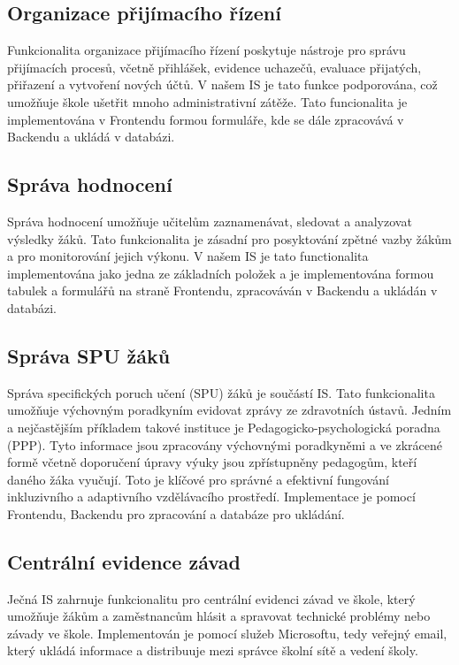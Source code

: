 \documentclass[FM,Proj]{tulthesis}
\begin{document}
\subsection*{Organizace přijímacího řízení}
Funkcionalita organizace přijímacího řízení poskytuje nástroje pro správu přijímacích procesů,
včetně přihlášek, evidence uchazečů, evaluace přijatých, přiřazení a vytvoření nových účtů.
V našem IS je tato funkce podporována, což umožňuje škole ušetřit mnoho administrativní zátěže.
Tato funcionalita je implementována v Frontendu formou formuláře, kde se dále zpracovává v 
Backendu a ukládá v databázi.

\subsection*{Správa hodnocení}
Správa hodnocení umožňuje učitelům zaznamenávat, sledovat a analyzovat výsledky žáků. Tato
funkcionalita je zásadní pro posyktování zpětné vazby žákům a pro monitorování jejich výkonu.
V našem IS je tato functionalita implementována jako jedna ze základních položek a je 
implementována formou tabulek a formulářů na straně Frontendu, zpracováván v Backendu a
ukládán v databázi.

\subsection*{Správa SPU žáků}
Správa specifických poruch učení (SPU) žáků je součástí IS. Tato funkcionalita umožňuje
výchovným poradkyním evidovat zprávy ze zdravotních ústavů. Jedním a nejčastějším 
příkladem takové instituce je Pedagogicko-psychologická poradna (PPP). Tyto informace
jsou zpracovány výchovnými poradkyněmi a ve zkrácené formě včetně doporučení úpravy
výuky jsou zpřístupněny pedagogům, kteří daného žáka vyučují. Toto je klíčové pro
správné a efektivní fungování inkluzivního a adaptivního vzdělávacího prostředí.
Implementace je pomocí Frontendu, Backendu pro zpracování a databáze pro ukládání.

\subsection*{Centrální evidence závad}
Ječná IS zahrnuje funkcionalitu pro centrální evidenci závad ve škole, který umožňuje
žákům a zaměstnancům hlásit a spravovat technické problémy nebo závady ve škole.
Implementován je pomocí služeb Microsoftu, tedy veřejný email, který ukládá informace
a distribuuje mezi správce školní sítě a vedení školy.
\end{document}
